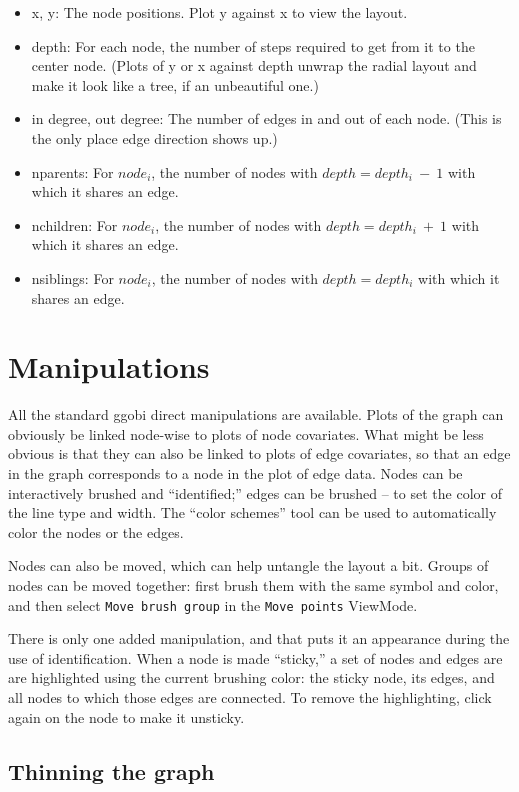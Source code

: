 \documentclass[11pt]{article}
\begin{document}
\begin{itemize}
\item x, y: The node positions.  Plot y against x to view the layout.
\item depth: For each node, the number of steps required to get from it
  to the center node. (Plots of y or x against depth unwrap the
  radial layout and make it look like a tree, if an unbeautiful one.)
\item in degree, out degree:  The number of edges in and out of each
  node. (This is the only place edge direction shows up.)
\item nparents: For $node_i$, the number of nodes with $depth = depth_i~-~1$
  with which it shares an edge. 
\item nchildren: For $node_i$, the number of nodes with $depth = depth_i~+~1$
  with which it shares an edge.
\item nsiblings: For $node_i$, the number of nodes with $depth = depth_i$
  with which it shares an edge.
\end{itemize}

\section{Manipulations}

All the standard ggobi direct manipulations are available.  Plots of
the graph can obviously be linked node-wise to plots of node covariates.
What might be less obvious is that they can also be linked to plots of
edge covariates, so that an edge in the graph corresponds to a node in the
plot of edge data.  Nodes can be interactively brushed and ``identified;''
edges can be brushed -- to set the color of the line type and width.
The ``color schemes'' tool can be used to automatically color the nodes
or the edges.

Nodes can also be moved, which can help untangle the layout a bit.
Groups of nodes can be moved together: first brush them with
the same symbol and color, and then select {\tt Move brush group}
in the {\tt Move points} ViewMode.

There is only one added manipulation, and that puts it an appearance
during the use of identification.  When a node is made ``sticky,'' a
set of nodes and edges are are highlighted using the current brushing
color:  the sticky node, its edges, and all nodes to which those edges
are connected.  To remove the highlighting, click again on the node to
make it unsticky.

\subsection{Thinning the graph}
\end{document}
